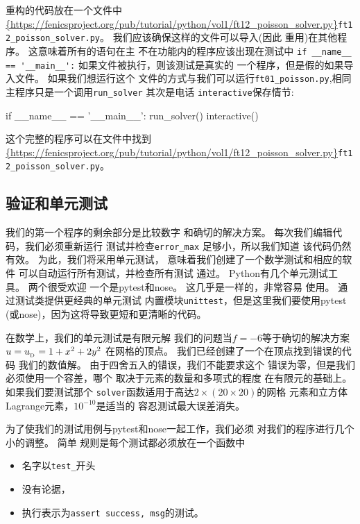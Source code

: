 
重构的代码放在一个文件中
\url{{https://fenicsproject.org/pub/tutorial/python/vol1/ft12_poisson_solver.py}}{\nolinkurl{ft12_poisson_solver.py}}。
我们应该确保这样的文件可以导入(因此
重用)在其他程序。 这意味着所有的语句在主
不在功能内的程序应该出现在测试中
\verb!if __name__ == '__main__':! 如果文件被执行，则该测试是真实的
一个程序，但是假的如果导入文件。 如果我们想运行这个
文件的方式与我们可以运行\verb!ft01_poisson.py!,相同
主程序只是一个调用\verb!run_solver! 其次是电话
\texttt{interactive}保存情节:

\begin{python}
if __name__ == '__main__':
    run_solver()
    interactive()
\end{python}
这个完整的程序可以在文件中找到\url{{https://fenicsproject.org/pub/tutorial/python/vol1/ft12_poisson_solver.py}}{\nolinkurl{ft12_poisson_solver.py}}。


\subsection{验证和单元测试}


我们的第一个程序的剩余部分是比较数字
和确切的解决方案。 每次我们编辑代码，我们必须重新运行
测试并检查\verb!error_max! 足够小，所以我们知道
该代码仍然有效。 为此，我们将采用单元测试，
意味着我们创建了一个数学测试和相应的软件
可以自动运行所有测试，并检查所有测试
通过。 Python有几个单元测试工具。 两个很受欢迎
一个是pytest和nose。 这几乎是一样的，非常容易
使用。 通过测试类提供更经典的单元测试
内置模块\texttt{unittest}，但是这里我们要使用pytest
(或nose)，因为这将导致更短和更清晰的代码。

在数学上，我们的单元测试是有限元解
我们的问题当$f=-6$等于确切的解决方案$u=\ub=1+x^2+2y^2$
在网格的顶点。
我们已经创建了一个在顶点找到错误的代码
我们的数值解。 由于四舍五入的错误，我们不能要求这个
错误为零，但是我们必须使用一个容差，哪个
取决于元素的数量和多项式的程度
在有限元的基础上。 如果我们要测试那个
\texttt{solver}函数适用于高达$2\times(20\times 20)$的网格
元素和立方体Lagrange元素，$10^{-10}$是适当的
容忍测试最大误差消失。

为了使我们的测试用例与pytest和nose一起工作，我们必须
对我们的程序进行几个小的调整。 简单
规则是每个测试都必须放在一个函数中

\begin{itemize}
 \item 名字以\verb!test_!开头

 \item 没有论据，

 \item 执行表示为\texttt{assert success, msg}的测试。
\end{itemize}

